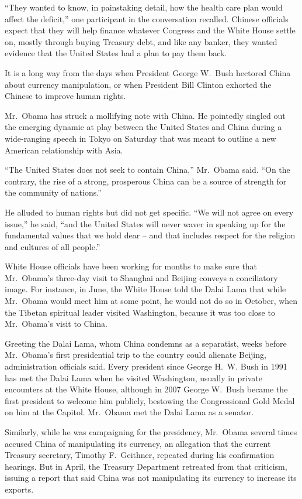 ﻿\documentclass[12pt]{article}
\begin{document}
``They wanted to know, in painstaking detail, how the health care plan would affect the deficit,''
one participant in the conversation recalled. Chinese officials expect that they will help finance
whatever Congress and the White House settle on, mostly through buying Treasury debt, and like any
banker, they wanted evidence that the United States had a plan to pay them back.

It is a long way from the days when President George W.~Bush hectored China about currency
manipulation, or when President Bill Clinton exhorted the Chinese to improve human rights.

Mr.~Obama has struck a mollifying note with China. He pointedly singled out the emerging dynamic at
play between the United States and China during a wide-ranging speech in Tokyo on Saturday that was
meant to outline a new American relationship with Asia.

``The United States does not seek to contain China,'' Mr.~Obama said. ``On the contrary, the rise of
a strong, prosperous China can be a source of strength for the community of nations.''

He alluded to human rights but did not get specific. ``We will not agree on every issue,'' he said,
``and the United States will never waver in speaking up for the fundamental values that we hold dear
-- and that includes respect for the religion and cultures of all people.''

White House officials have been working for months to make sure that Mr.~Obama's three-day visit to
Shanghai and Beijing conveys a conciliatory image. For instance, in June, the White House told the
Dalai Lama that while Mr.~Obama would meet him at some point, he would not do so in October, when
the Tibetan spiritual leader visited Washington, because it was too close to Mr.~Obama's visit to
China.

Greeting the Dalai Lama, whom China condemns as a separatist, weeks before Mr.~Obama's first
presidential trip to the country could alienate Beijing, administration officials said. Every
president since George H.~W. Bush in 1991 has met the Dalai Lama when he visited Washington, usually
in private encounters at the White House, although in 2007 George W.~Bush became the first president
to welcome him publicly, bestowing the Congressional Gold Medal on him at the Capitol. Mr.~Obama met
the Dalai Lama as a senator.

Similarly, while he was campaigning for the presidency, Mr.~Obama several times accused China of
manipulating its currency, an allegation that the current Treasury secretary, Timothy F.~Geithner,
repeated during his confirmation hearings. But in April, the Treasury Department retreated from that
criticism, issuing a report that said China was not manipulating its currency to increase its
exports.
\end{document}
